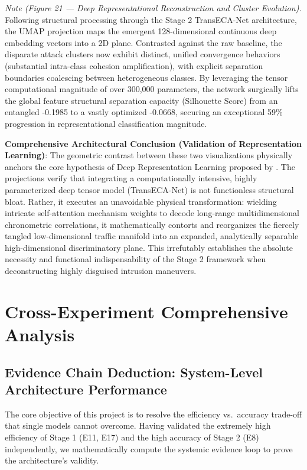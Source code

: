 \documentclass[sigconf]{acmart}
\begin{document}
\textit{Note (Figure 21 --- Deep Representational Reconstruction and Cluster Evolution).} Following structural processing through the Stage 2 TransECA-Net architecture, the UMAP projection maps the emergent 128-dimensional continuous deep embedding vectors into a 2D plane. Contrasted against the raw baseline, the disparate attack clusters now exhibit distinct, unified convergence behaviors (substantial intra-class cohesion amplification), with explicit separation boundaries coalescing between heterogeneous classes. By leveraging the tensor computational magnitude of over 300,000 parameters, the network surgically lifts the global feature structural separation capacity (Silhouette Score) from an entangled -0.1985 to a vastly optimized -0.0668, securing an exceptional 59\% progression in representational classification magnitude.


\textbf{Comprehensive Architectural Conclusion (Validation of Representation Learning)}: The geometric contrast between these two visualizations physically anchors the core hypothesis of Deep Representation Learning proposed by \cite{5}. The projections verify that integrating a computationally intensive, highly parameterized deep tensor model (TransECA-Net) is not functionless structural bloat. Rather, it executes an unavoidable physical transformation: wielding intricate self-attention mechanism weights to decode long-range multidimensional chronometric correlations, it mathematically contorts and reorganizes the fiercely tangled low-dimensional traffic manifold into an expanded, analytically separable high-dimensional discriminatory plane. This irrefutably establishes the absolute necessity and functional indispensability of the Stage 2 framework when deconstructing highly disguised intrusion maneuvers.

\section{Cross-Experiment Comprehensive Analysis}

\subsection{Evidence Chain Deduction: System-Level Architecture Performance}

The core objective of this project is to resolve the efficiency vs.\ accuracy trade-off that single models cannot overcome. Having validated the extremely high efficiency of Stage 1 (E11, E17) and the high accuracy of Stage 2 (E8) independently, we mathematically compute the systemic evidence loop to prove the architecture's validity.
\end{document}

